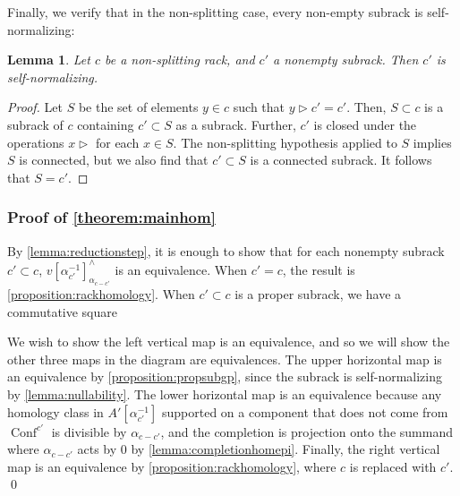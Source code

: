 \documentclass[12 pt]{amsart}
\theoremstyle{plain}
\newtheorem{lemma}[theorem]{Lemma}
\theoremstyle{definition}
\theoremstyle{remark}
\numberwithin{equation}{section}
\DeclareMathOperator\Hur{Hur}
\DeclareMathOperator\Conf{Conf}
\newcommand\QQ{\mathbb{Q}}
\begin{document}
Finally, we verify that in the non-splitting case, every non-empty subrack is self-normalizing:
\begin{lemma}\label{lemma:nullability}
	Let $c$ be a non-splitting rack, and $c'$ a nonempty subrack. Then $c'$ is self-normalizing.
\end{lemma}

\begin{proof}
	Let $S$ be the set of elements $y \in c$ such that $y\triangleright c'=
	c'$. Then, $S\subset c$ is a subrack of $c$ containing $c' \subset S$ as a
	subrack.
	Further, $c'$ is 
	closed under the operations $x\triangleright$ for each $x \in S$. 
	The non-splitting hypothesis applied to $S$ implies $S$ is connected,
	but we also find that $c' \subset S$ is a connected subrack. It follows
	that $S=c'$.
\end{proof}

\subsubsection{Proof of \autoref{theorem:mainhom}}
\label{subsubsection:mainhom}
	By \autoref{lemma:reductionstep}, it is enough to show that for each nonempty
	subrack $c' \subset c$, $v[\alpha_{c'}^{-1}]^{\wedge}_{\alpha_{c-c'}}$ is
	an equivalence. When $c' = c$, the result is
	\autoref{proposition:rackhomology}. When $c'\subset c$ is a proper
	subrack, we have a commutative square
	\begin{center}
		\end{center}

	We wish to show the left vertical map is an equivalence, and so we will
	show the other three maps in the diagram are equivalences.
	The upper horizontal map is an equivalence by
	\autoref{proposition:propsubgp}, since the subrack is self-normalizing by \autoref{lemma:nullability}. The lower horizontal map is an
	equivalence because any homology class in $A'[\alpha_{c'}^{-1}]$ supported
	on a component that does not come from $\Conf^{c'}$
	is divisible by $\alpha_{c-c'}$, and the completion is projection onto
	the summand where $\alpha_{c-c'}$ acts by $0$ by \autoref{lemma:completionhomepi}.
	Finally, the right vertical map is an equivalence by
	\autoref{proposition:rackhomology}, where $c$ is replaced with $c'$.
	\qed
\end{document}
